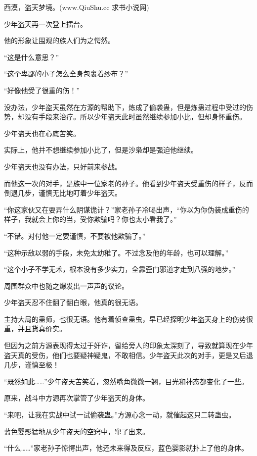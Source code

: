 
\begin{this_body}

西漠，盗天梦境。(www.QiuShu.cc 求书小说网)

少年盗天再一次登上擂台。

他的形象让围观的族人们为之愕然。

“这是什么意思？”

“这个卑鄙的小子怎么全身包裹着纱布？”

“好像他受了很重的伤！”

没办法，少年盗天虽然在方源的帮助下，炼成了偷袭蛊，但是炼蛊过程中受过的伤势，却没有手段来治疗。所以少年盗天此时虽然继续参加小比，但却身怀重伤。

少年盗天也在心底苦笑。

实际上，他并不想继续参加小比了，但是沙枭却是强迫他继续。

少年盗天也没有办法，只好前来参战。

而他这一次的对手，是族中一位家老的孙子。他看到少年盗天受重伤的样子，反而倒退几步，谨慎无比地盯着少年盗天。

“你这家伙又在耍弄什么阴谋诡计？”家老孙子冷喝出声，“你以为你伪装成重伤的样子，我就会上你的当，受你欺骗吗？你也太小看我了。”

“不错。对付他一定要谨慎，不要被他欺骗了。”

“这种示敌以弱的手段，未免太幼稚了。不过念及他的年龄，也可以理解。”

“这个小子不学无术，根本没有多少实力，全靠歪门邪道才走到八强的地步。”

周围群众中也随之爆发出一声声的议论。

少年盗天忍不住翻了翻白眼，他真的很无语。

主持大局的蛊师，也很无语。他有着侦查蛊虫，早已经探明少年盗天身上的伤势很重，并且货真价实。

但因为之前方源表现得太过于奸诈，留给旁人的印象太深刻了，导致就算现在少年盗天真的受伤，他们也要疑神疑鬼，不敢相信。少年盗天此次的对手，更是又后退几步，谨慎至极！

“既然如此……”少年盗天苦笑着，忽然嘴角微微一翘，目光和神态都变化了一些。

原来，战斗中方源再次掌管了少年盗天的身体。

“来吧，让我在实战中试一试偷袭蛊。”方源心念一动，就催起这只二转蛊虫。

蓝色婴影猛地从少年盗天的空窍中，窜了出来。

“什么……”家老孙子惊愕出声，他还未来得及反应，蓝色婴影就扑上了他的身体。


\end{this_body}
